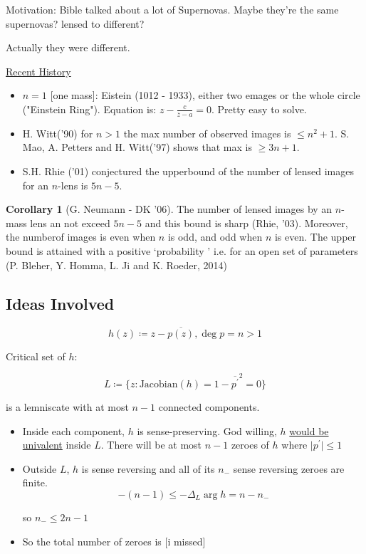 \documentclass{article}
\theoremstyle{definition}
\newtheorem{corollary}[theorem]{Corollary}
\begin{document}
Motivation: Bible talked about a lot of Supernovas. Maybe they're the same supernovas? lensed to different?

Actually they were different.

\underline{Recent History} 

\begin{itemize}
    \item \(n = 1\) [one mass]: Eistein (1012 - 1933), either two emages or the whole circle ("Einstein Ring"). Equation is: \(z - \frac{c}{\overline{z} - a} = 0\). Pretty easy to solve.
    \item H. Witt('90) for \(n > 1\) the max number of observed images is \(\leq n^2 + 1\). S. Mao, A. Petters and H. Witt('97) shows that max is \(\geq 3n + 1\).
    \item S.H. Rhie ('01) conjectured the upperbound of the number of lensed images for an \(n\)-lens is \(5n - 5\).
\end{itemize} 

\begin{corollary}
    [G. Neumann - DK '06] The number of lensed images by an \(n\)-mass lens an not exceed \(5n - 5\) and this bound is sharp (Rhie, '03). Moreover, the numberof images is even when \(n\) is odd, and odd when \(n\) is even. The upper bound is attained with a positive `probability ' i.e. for an open set of parameters (P. Bleher, Y. Homma, L. Ji and K. Roeder, 2014)
\end{corollary}

\subsection*{Ideas Involved}

\[
    h(z) \coloneqq z - \overline{p(z)}, \deg p = n > 1
\]

Critical set of \(h\):

\[
    L \coloneqq \{ z : \text{Jacobian}(h) = 1 - \overline{p^{\prime} } ^2 = 0  \} 
\]

is a lemniscate with at most \(n-1\) connected components.

\begin{itemize}
    \item Inside each component, \(h\) is sense-preserving. God willing, \(h\) \underline{would be univalent} inside \(L\). There will be at most \(n-1\) zeroes of \(h\) where \(\vert p^{\prime}  \vert \leq 1\) 
    \item Outside \(L\), \(h\) is sense reversing and all of its \(n_-\) sense reversing zeroes are finite.
    \[
        - (n-1) \leq - \Delta _L \operatorname{arg}h = n - n_-
    \]

    so \(n_- \leq 2n - 1\) 

    \item So the total number of zeroes is [i missed]
\end{itemize} 
\end{document}
